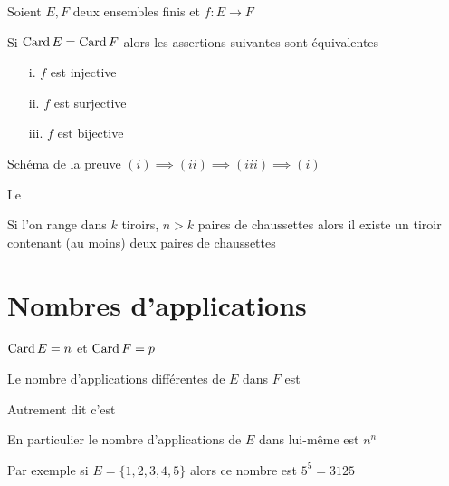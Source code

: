 \begin{frame}
Soient $E,F$ deux ensembles finis et $f : E \to F$
\begin{proposition}
Si $\mathop{\text{Card}}\nolimits E = \mathop{\text{Card}}\nolimits F$
alors les assertions suivantes sont équivalentes
\pause
\begin{enumerate}
  \item[i.] $f$ est injective
  \item[ii.] $f$ est surjective
  \item[iii.] $f$ est bijective
\end{enumerate}
\end{proposition}

\pause

Schéma de la preuve \qquad $ (i) \implies (ii) \implies (iii) \implies (i) $

\pause
\bigskip

Le 
\begin{proposition}
Si l'on range dans $k$ tiroirs, $n > k$ paires de chaussettes
alors il existe un tiroir contenant (au moins) deux paires
de chaussettes
\end{proposition}

  
\end{frame}


\section{Nombres d'applications}

\begin{frame}

$\mathop{\text{Card}}\nolimits E=n$ \quad et \quad $\mathop{\text{Card}}\nolimits F=p$
\begin{proposition}
Le nombre d'applications différentes de $E$ dans $F$ est 
\pause
\end{proposition}

\pause
\medskip

Autrement dit c'est 

\pause 
\bigskip

\begin{exemple}
En particulier le nombre  d'applications de $E$ dans lui-même est $n^n$

\pause 
\smallskip

Par exemple si $E=\{1,2,3,4,5\}$ alors ce nombre est $5^5 = 3125$
\end{exemple}
\end{frame}

